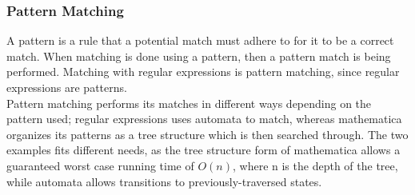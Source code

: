   \subsubsection{Pattern Matching}
   A pattern is a rule that a potential match must adhere to for it to be a 
   correct match. When matching is done using a pattern, then a pattern match 
   is being performed. Matching with regular expressions is pattern matching, 
   since regular expressions are patterns.\\
   Pattern matching performs its matches in different ways depending on the 
   pattern used; regular expressions uses automata to match, whereas 
   mathematica organizes its patterns as a tree structure which is then searched 
   through. The two examples fits different needs, as the tree structure 
   form of mathematica allows a guaranteed worst case running time of 
   $O(n)$, where n is the depth of the tree, while automata allows transitions 
   to previously-traversed states.
